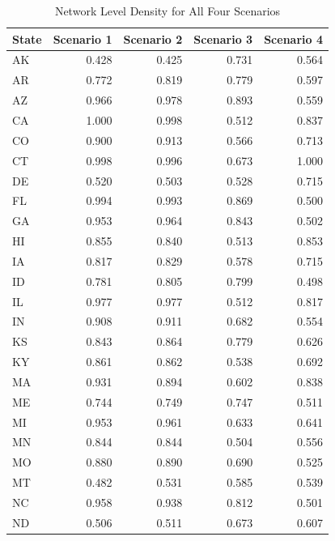 \documentclass[]{article}
\begin{document}
\begin{table}[!h]

\caption{\label{tab:unnamed-chunk-76}Network Level Density for All Four Scenarios}
\centering
\begin{tabular}{l|r|r|r|r}
\hline
State & Scenario 1 & Scenario 2 & Scenario 3 & Scenario 4\\
\hline
\rowcolor{gray!6}  AK & 0.428 & 0.425 & 0.731 & 0.564\\
\hline
AR & 0.772 & 0.819 & 0.779 & 0.597\\
\hline
\rowcolor{gray!6}  AZ & 0.966 & 0.978 & 0.893 & 0.559\\
\hline
CA & 1.000 & 0.998 & 0.512 & 0.837\\
\hline
\rowcolor{gray!6}  CO & 0.900 & 0.913 & 0.566 & 0.713\\
\hline
CT & 0.998 & 0.996 & 0.673 & 1.000\\
\hline
\rowcolor{gray!6}  DE & 0.520 & 0.503 & 0.528 & 0.715\\
\hline
FL & 0.994 & 0.993 & 0.869 & 0.500\\
\hline
\rowcolor{gray!6}  GA & 0.953 & 0.964 & 0.843 & 0.502\\
\hline
HI & 0.855 & 0.840 & 0.513 & 0.853\\
\hline
\rowcolor{gray!6}  IA & 0.817 & 0.829 & 0.578 & 0.715\\
\hline
ID & 0.781 & 0.805 & 0.799 & 0.498\\
\hline
\rowcolor{gray!6}  IL & 0.977 & 0.977 & 0.512 & 0.817\\
\hline
IN & 0.908 & 0.911 & 0.682 & 0.554\\
\hline
\rowcolor{gray!6}  KS & 0.843 & 0.864 & 0.779 & 0.626\\
\hline
KY & 0.861 & 0.862 & 0.538 & 0.692\\
\hline
\rowcolor{gray!6}  MA & 0.931 & 0.894 & 0.602 & 0.838\\
\hline
ME & 0.744 & 0.749 & 0.747 & 0.511\\
\hline
\rowcolor{gray!6}  MI & 0.953 & 0.961 & 0.633 & 0.641\\
\hline
MN & 0.844 & 0.844 & 0.504 & 0.556\\
\hline
\rowcolor{gray!6}  MO & 0.880 & 0.890 & 0.690 & 0.525\\
\hline
MT & 0.482 & 0.531 & 0.585 & 0.539\\
\hline
\rowcolor{gray!6}  NC & 0.958 & 0.938 & 0.812 & 0.501\\
\hline
ND & 0.506 & 0.511 & 0.673 & 0.607\\

\end{tabular}
\end{table}
\end{document}
